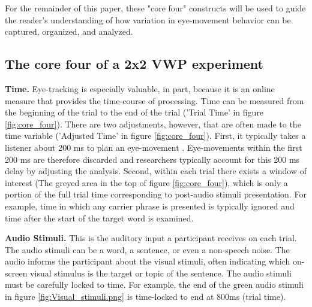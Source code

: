 For the remainder of this paper, these "core four" constructs will be used to guide the reader's understanding of how variation in eye-movement behavior can be captured, organized, and analyzed. 

\subsection{The core four of a 2x2 VWP experiment}

\textbf{Time.} Eye-tracking is especially valuable, in part, because it is an online measure that provides the time-course of processing. Time can be measured from the beginning of the trial to the end of the trial ('Trial Time' in figure \ref{fig:core_four}). There are two adjustments, however, that are often made to the time variable ('Adjusted Time'  in figure \ref{fig:core_four}). First, it typically takes a listener about 200 ms to plan an eye-movement \parencite[][]{Matin_Shao_Boff_1993}. Eye-movements within the first 200 ms are therefore discarded and researchers typically account for this 200 ms delay by adjusting the analysis. Second, within each trial there exists a window of interest (The greyed area in the top of figure \ref{fig:core_four}), which is only a portion of the full trial time corresponding to post-audio stimuli presentation. For example, time in which any carrier phrase is presented is typically ignored and time after the start of the target word is examined.

\textbf{Audio Stimuli.} This is the auditory input a participant receives on each trial. The audio stimuli can be a word, a sentence, or even a non-speech noise. The audio informs the participant about the visual stimuli, often indicating which on-screen visual stimulus is the target or topic of the sentence. The audio stimuli must be carefully locked to time. For example, the end of the green audio stimuli in figure \ref{fig:Visual_stimuli.png} is time-locked to end at 800ms (trial time).

